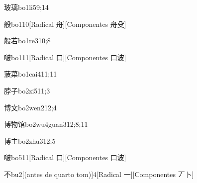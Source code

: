 \begin{verbete}{玻璃}{bo1li5}{9;14}
\end{verbete}

\begin{verbete}{般}{bo1}{10}[Radical 舟][Componentes 舟殳]
\end{verbete}

\begin{verbete}{般若}{bo1re3}{10;8}
\end{verbete}

\begin{verbete}{啵}{bo1}{11}[Radical 口][Componentes 口波]
\end{verbete}

\begin{verbete}{菠菜}{bo1cai4}{11;11}
\end{verbete}

\begin{verbete}{脖子}{bo2zi5}{11;3}
\end{verbete}

\begin{verbete}{博文}{bo2wen2}{12;4}
\end{verbete}

\begin{verbete}{博物馆}{bo2wu4guan3}{12;8;11}
\end{verbete}

\begin{verbete}{博主}{bo2zhu3}{12;5}
\end{verbete}

\begin{verbete}{啵}{bo5}{11}[Radical 口][Componentes 口波]
\end{verbete}

\begin{verbete}{不}{bu2}[(antes de quarto tom)]{4}[Radical 一][Componentes 丆卜]
\end{verbete}

